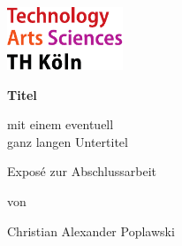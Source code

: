 \begin{titlepage}

\begin{center}

\includegraphics[width=0.26\textwidth]{images/THlogoheader.pdf}

\vspace{0.8cm}

\begin{rmfamily}
\begin{huge}
\textbf{Titel}\\
\end{huge}
\vspace{0.5cm}
\begin{LARGE}
mit einem eventuell\\ganz langen Untertitel\\
\end{LARGE}
\end{rmfamily}

\vspace{1.6cm}



\begin{LARGE}
\begin{scshape}
Exposé zur Abschlussarbeit\\[0.8em]
\end{scshape}
\end{LARGE}

\begin{large}
von\\
\vspace{0.2cm}
\begin{LARGE}
Christian Alexander Poplawski\\
\end{LARGE}
\end{large}


\end{center}
\end{titlepage}
